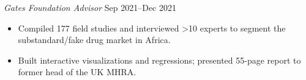 \textit{Gates Foundation Advisor} \hfill Sep 2021--Dec 2021
\begin{itemize}
	\item Compiled 177 field studies and interviewed >10 experts to segment the substandard/fake drug market in Africa.
	\item Built interactive visualizations and regressions; presented 55-page report to former head of the UK MHRA.
\end{itemize}\par